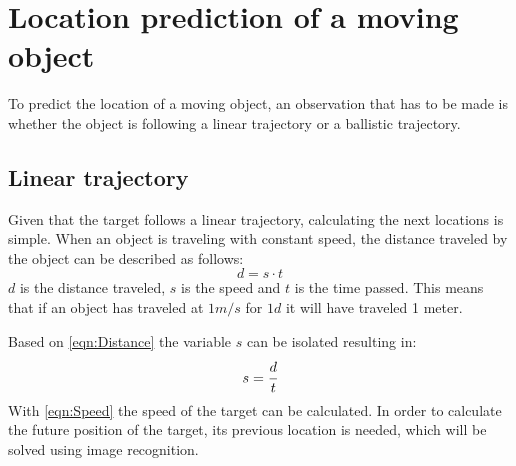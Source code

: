 \section{Location prediction of a moving object}
To predict the location of a moving object, an observation that has to be made is whether the object is following a linear trajectory or a ballistic trajectory.

\subsection{Linear trajectory}
Given that the target follows a linear trajectory, calculating the next locations is simple.  
When an object is traveling with constant speed, the distance traveled by the object can be described as follows:
\begin{equation}\label{eqn:Distance}
d = s \cdot t
\end{equation}
$ d $ is the distance traveled, $ s $ is the speed and $ t $ is the time passed.
This means that if an object has traveled at $ 1 m/s $ for $ 1 d $ it will have traveled 1 meter. 

Based on \autoref{eqn:Distance} the variable $ s $ can be isolated resulting in:
\begin{equation}\label{eqn:Speed}
s = \cfrac{d}{t}
\end{equation}
With \autoref{eqn:Speed} the speed of the target can be calculated. 
In order to calculate the future position of the target, its previous location is needed, which will be solved using image recognition.
